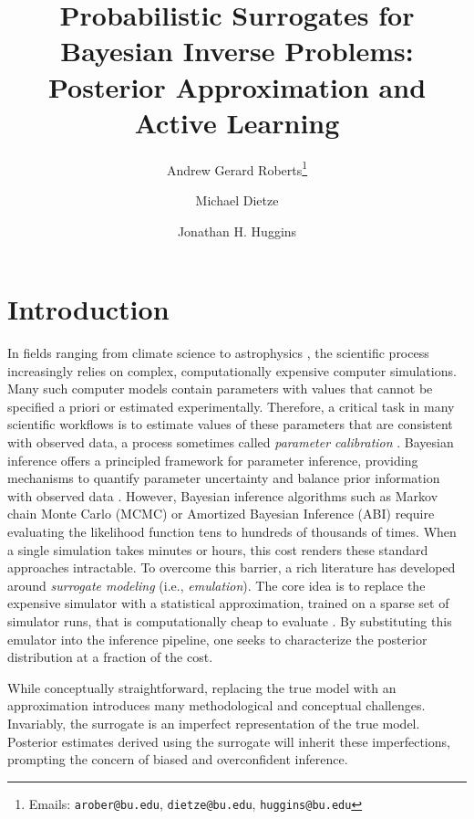 \documentclass[12pt]{article}
\title{Probabilistic Surrogates for Bayesian Inverse Problems: Posterior Approximation and Active Learning}
\author[1]{Andrew Gerard Roberts\thanks{Emails: \texttt{arober@bu.edu}, \texttt{dietze@bu.edu}, \texttt{huggins@bu.edu}}}
\author[2]{Michael Dietze}
\author[1,3]{Jonathan H. Huggins}
\affil[1]{Faculty of Computing and Data Sciences, Boston University}
\affil[2]{Department of Earth and Environment, Boston University}
\affil[3]{Department of Mathematics and Statistics, Boston University}
\date{}
\begin{document}
\maketitle

\section{Introduction}
In fields ranging from climate science \citep{ESM_modeling_2pt0}  to astrophysics
\citep{VarmaBlackHole2019,npeAstrophysics}, the scientific process increasingly relies on complex, computationally
expensive computer simulations. Many such computer models contain parameters with values that cannot be specified
a priori or estimated experimentally. Therefore, a critical task in many scientific workflows is to estimate values
of these parameters that are consistent with observed data, a process sometimes called 
\textit{parameter calibration} \citep{computerModelCalibrationReview}.
Bayesian inference offers a principled framework for parameter inference, providing mechanisms to 
quantify parameter uncertainty and balance prior information with observed data \citep{KOH}.
However, Bayesian inference algorithms such as Markov chain Monte Carlo (MCMC) or Amortized 
Bayesian Inference (ABI) require evaluating the likelihood function tens to hundreds of thousands of times. 
When a single simulation takes minutes or hours, this cost renders these standard approaches intractable.
To overcome this barrier, a rich literature has developed around \textit{surrogate modeling} (i.e., \textit{emulation}). The core 
idea is to replace the expensive simulator with a statistical approximation, trained on a sparse set of simulator runs, that is 
computationally cheap to evaluate \citep{KOH,gramacy2020surrogates}. By substituting this emulator into the inference pipeline, 
one seeks to characterize the posterior distribution at a fraction of the cost.

While conceptually straightforward, replacing the true model with an approximation introduces many methodological
and conceptual challenges. Invariably, the surrogate is an imperfect representation of the true
model. Posterior estimates derived using the surrogate will inherit these imperfections, prompting the 
concern of biased and overconfident inference.
\end{document}

